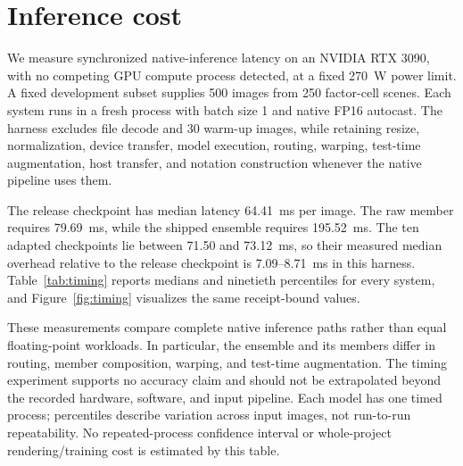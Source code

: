 \section{Inference cost}
\label{sec:cost}

We measure synchronized native-inference latency on an NVIDIA RTX 3090,
with no competing GPU compute process detected, at a fixed 270~W power limit. A fixed development subset supplies 500 images
from 250 factor-cell scenes. Each system runs in
a fresh process with batch size 1 and native FP16 autocast. The harness excludes
file decode and 30 warm-up images, while retaining resize, normalization,
device transfer, model execution, routing, warping, test-time augmentation, host
transfer, and notation construction whenever the native pipeline uses them.

The release checkpoint has median latency 64.41~ms per image. The raw member
requires 79.69~ms, while the shipped ensemble requires 195.52~ms. The ten
adapted checkpoints lie between 71.50 and 73.12~ms, so their measured median
overhead relative to the release checkpoint is 7.09--8.71~ms in this harness.
Table~\ref{tab:timing} reports medians and ninetieth percentiles for every
system, and Figure~\ref{fig:timing} visualizes the same receipt-bound values.



These measurements compare complete native inference paths rather than equal
floating-point workloads. In particular, the ensemble and its members differ
in routing, member composition, warping, and test-time augmentation. The timing
experiment supports no accuracy claim and should not be extrapolated beyond the
recorded hardware, software, and input pipeline. Each model has one timed process;
percentiles describe variation across input images, not run-to-run repeatability.
No repeated-process confidence interval or whole-project rendering/training cost
is estimated by this table.
